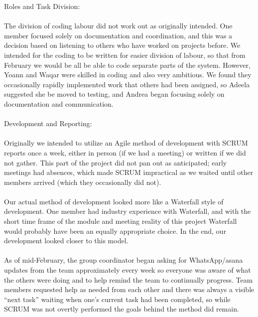 \documentclass[11pt]{article}
\begin{document}
Roles and Task Division:
\\ \\
The division of coding labour did not work out as originally intended. One member focused solely on documentation and coordination, and this was a decision based on listening to others who have worked on projects before. We intended for the coding to be written for easier division of labour, so that from February we would be all be able to code separate parts of the system. However, Yoann and Waqar were skilled in coding and also very ambitious. We found they occasionally rapidly implemented work that others had been assigned, so Adeela suggested she be moved to testing, and Andrea began focusing solely on documentation and communication. 
\\ \\
Development and Reporting:
\\ \\
Originally we intended to utilize an Agile method of development with SCRUM reports once a week, either in person (if we had a meeting) or written if we did not gather. This part of the project did not pan out as anticipated; early meetings had absences, which made SCRUM impractical as we waited until other members arrived (which they occasionally did not). 
\\ \\
Our actual method of development looked more like a Waterfall style of development. One member had industry experience with Waterfall, and with the short time frame of the module and meeting reality of this project Waterfall would probably have been an equally appropriate choice. In the end, our development looked closer to this model.
\\ \\
As of mid-February, the group coordinator began asking for WhatsApp/asana updates from the team approximately every week so everyone was aware of what the others were doing and to help remind the team to continually progress. Team members requested help as needed from each other and there was always a visible “next task” waiting when one’s current task had been completed, so while SCRUM was not overtly performed the goals behind the method did remain.
\\ \\
\end{document}
